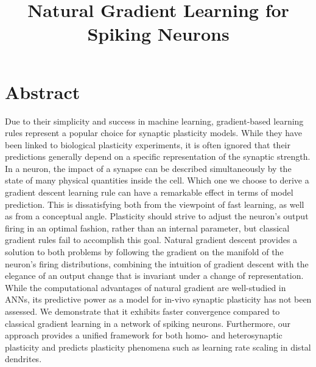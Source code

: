 \documentclass[twocolumn,12pt]{article}
\begin{document}
\setlength{\abovedisplayskip}{3pt}
\setlength{\belowdisplayskip}{3pt}
\title{Natural Gradient Learning for Spiking Neurons \vspace*{-3cm}}
\date{}
\maketitle

\section*{Abstract}
\vspace*{-0.3cm}
Due to their simplicity and success in machine learning, gradient-based learning rules represent a popular choice for synaptic plasticity models. While they have been linked to biological plasticity experiments, it is often ignored that their predictions generally depend on a specific representation of the synaptic strength. In a neuron, the impact of a synapse can be described simultaneously by the state of many physical quantities inside the cell. Which one we choose to derive a gradient descent learning rule can have a remarkable effect in terms of model prediction. This is dissatisfying both from the viewpoint of fast learning, as well as from a conceptual angle. Plasticity should strive to adjust the neuron's output firing in an optimal fashion, rather than an internal parameter, but classical gradient rules fail to accomplish this goal. Natural gradient descent provides a solution to both problems by following the gradient on the manifold of the neuron's firing distributions, combining the intuition of gradient descent with the elegance of an output change that is invariant under a change of representation. While the computational advantages of natural gradient are well-studied in ANNs, its predictive power as a model for in-vivo synaptic plasticity has not been assessed. We demonstrate that it exhibits faster convergence compared to classical gradient learning in a network of spiking neurons. Furthermore, our approach provides a unified framework for both homo- and heterosynaptic plasticity and  predicts plasticity phenomena such as learning rate scaling in distal dendrites.
\vspace*{-0.7cm}
\end{document}

